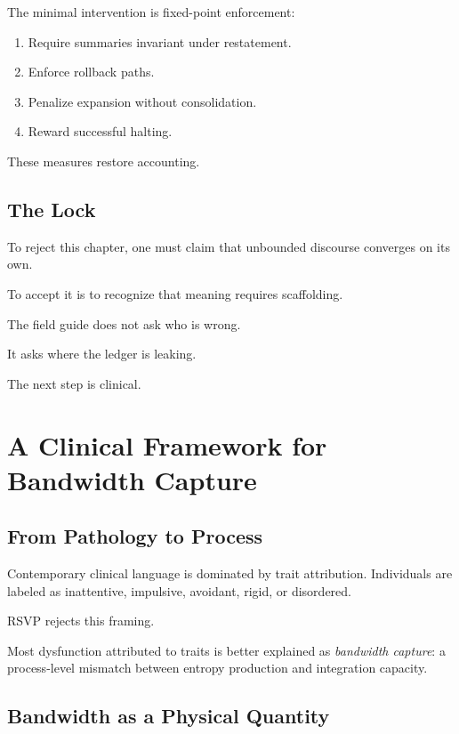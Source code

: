 \documentclass[11pt]{book}
\begin{document}
The minimal intervention is fixed-point enforcement:

\begin{enumerate}
\item Require summaries invariant under restatement.
\item Enforce rollback paths.
\item Penalize expansion without consolidation.
\item Reward successful halting.
\end{enumerate}

These measures restore accounting.

\section{The Lock}

To reject this chapter, one must claim that unbounded discourse converges on its
own.

To accept it is to recognize that meaning requires scaffolding.

The field guide does not ask who is wrong.

It asks where the ledger is leaking.

The next step is clinical.


\chapter{A Clinical Framework for Bandwidth Capture}

\section{From Pathology to Process}

Contemporary clinical language is dominated by trait attribution.
Individuals are labeled as inattentive, impulsive, avoidant, rigid, or
disordered.

RSVP rejects this framing.

Most dysfunction attributed to traits is better explained as
\emph{bandwidth capture}: a process-level mismatch between entropy production
and integration capacity.

\section{Bandwidth as a Physical Quantity}
\end{document}
